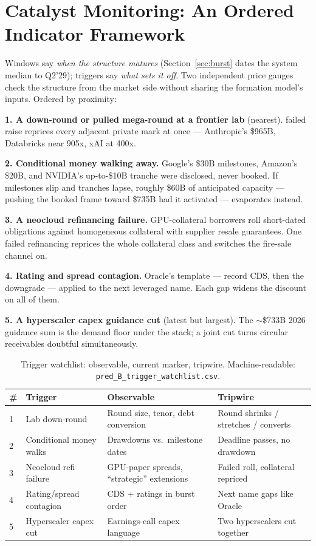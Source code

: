 \documentclass[11pt,a4paper]{article}
\begin{document}
\section{Catalyst Monitoring: An Ordered Indicator Framework}\label{sec:triggers}
Windows say \emph{when the structure matures} (Section~\ref{sec:burst} dates
the system median to Q2'29); triggers say \emph{what sets it off}. Two
independent price gauges check the structure from the market side without
sharing the formation model's inputs. Ordered by proximity:

\textbf{1. A down-round or pulled mega-round at a frontier lab} (nearest).
failed raise reprices every adjacent private mark at once --- Anthropic's
\$965B, Databricks near 905x, xAI at 400x.

\textbf{2. Conditional money walking away.} Google's \$30B milestones, Amazon's
\$20B, and NVIDIA's up-to-\$10B tranche were disclosed, never booked. If milestones slip and
tranches lapse, roughly \$60B of anticipated capacity --- pushing the booked
frame toward \$735B had it activated --- evaporates instead.

\textbf{3. A neocloud refinancing failure.} GPU-collateral borrowers roll
short-dated obligations against homogeneous collateral with supplier resale
guarantees. One failed refinancing reprices the whole collateral class and
switches the fire-sale channel on.

\textbf{4. Rating and spread contagion.} Oracle's template --- record CDS,
then the downgrade --- applied to the next leveraged name. Each gap widens
the discount on all of them.

\textbf{5. A hyperscaler capex guidance cut} (latest but largest). The
$\sim$\$733B 2026 guidance sum is the demand floor under the stack; a joint
cut turns circular receivables doubtful simultaneously.

\begin{table}[htbp]
\centering
\caption{Trigger watchlist: observable, current marker, tripwire. Machine-readable: \texttt{pred\_B\_trigger\_watchlist.csv}.}
    \label{tab:13-trigger-watchlist-observable-current}
\begin{tabular}{l>{\raggedright\arraybackslash}p{3.2cm}>{\raggedright\arraybackslash}p{3.6cm}>{\raggedright\arraybackslash}p{3.6cm}}
\toprule
\# & Trigger & Observable & Tripwire \\
\midrule
1 & Lab down-round & Round size, tenor, debt conversion & Round shrinks / stretches / converts \\
2 & Conditional money walks & Drawdowns vs.\ milestone dates & Deadline passes, no drawdown \\
3 & Neocloud refi failure & GPU-paper spreads, ``strategic'' extensions & Failed roll, collateral repriced \\
4 & Rating/spread contagion & CDS + ratings in burst order & Next name gaps like Oracle \\
5 & Hyperscaler capex cut & Earnings-call capex language & Two hyperscalers cut together \\
\bottomrule
\end{tabular}
\end{table}
\end{document}
